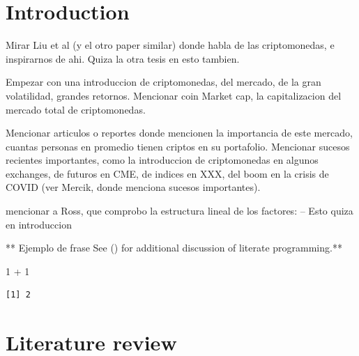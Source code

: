 \documentclass[
  12pt,
  a4paper,
  openany]{scrbook}
\newenvironment{Shaded}{\begin{snugshade}}{\end{snugshade}}
\newcommand{\DecValTok}[1]{\textcolor[rgb]{0.68,0.00,0.00}{#1}}
\newcommand{\SpecialCharTok}[1]{\textcolor[rgb]{0.37,0.37,0.37}{#1}}
\begin{document}
\tableofcontents 

\listoffigures
\begingroup
\let\clearpage\relax
\listoftables
\endgroup

\let\mainmatter\mainmatterreal
\mainmatter



\chapter{Introduction}\label{introduction}

Mirar Liu et al (y el otro paper similar) donde habla de las
criptomonedas, e inspirarnos de ahi. Quiza la otra tesis en esto
tambien.

Empezar con una introduccion de criptomonedas, del mercado, de la gran
volatilidad, grandes retornos. Mencionar coin Market cap, la
capitalizacion del mercado total de criptomonedas.

Mencionar articulos o reportes donde mencionen la importancia de este
mercado, cuantas personas en promedio tienen criptos en su portafolio.
Mencionar sucesos recientes importantes, como la introduccion de
criptomonedas en algunos exchanges, de futuros en CME, de indices en
XXX, del boom en la crisis de COVID (ver Mercik, donde menciona sucesos
importantes).

mencionar a Ross, que comprobo la estructura lineal de los factores: --
Esto quiza en introduccion

** Ejemplo de frase See () for
additional discussion of literate programming.**

\begin{Shaded}
\begin{Highlighting}[]
\DecValTok{1} \SpecialCharTok{+} \DecValTok{1}
\end{Highlighting}
\end{Shaded}

\begin{verbatim}
[1] 2
\end{verbatim}


\chapter{Literature review}\label{literature-review}
\end{document}
